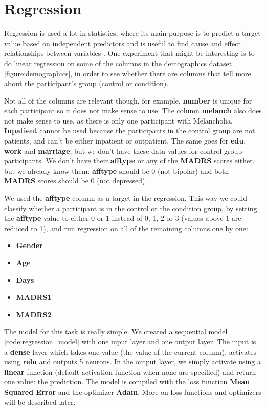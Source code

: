 
\section{Regression}

Regression is used a lot in statistics, where its main purpose is to predict a target value based on independent predictors and is useful to find cause and effect 
relationships between variables \cite{linear_regression_ml}. One experiment that might be interesting is to do linear regression on some of the columns in the demographics dataset 
\ref{figure:demographics}, in order to see whether there are columns that tell more about the participant's group (control or condition).  

Not all of the columns are relevant though, for example, \textbf{number} is unique for each participant so it does not make sense to use. 
The column \textbf{melanch} also does not make sense to use, as there is only one participant with Melancholia. 
\textbf{Inpatient} cannot be used because the participants in the control group are not patients, and can't be either inpatient or outpatient. 
The same goes for \textbf{edu}, \textbf{work} and \textbf{marriage}, but we don't have these data values for control group participants. 
We don't have their \textbf{afftype} or any of the \textbf{MADRS} scores either, but we already know them: \textbf{afftype} should be 0 (not bipolar) 
and both \textbf{MADRS} scores should be 0 (not depressed). 

We used the \textbf{afftype} column as a target in the regression. This way we could classify whether a participant is in the control or the condition group, 
by setting the \textbf{afftype} value to either 0 or 1 instead of 0, 1, 2 or 3 (values above 1 are reduced to 1), and run regression on all of the remaining 
columns one by one:

\begin{itemize}
      \item \textbf{Gender}
      \item \textbf{Age}
      \item \textbf{Days}
      \item \textbf{MADRS1}
      \item \textbf{MADRS2}
\end{itemize}



The model for this task is really simple. We created a sequential model \ref{code:regression_model} with one input layer and one output layer. 
The input is a \textbf{dense} layer which takes one value (the value of the current column), activates using \textbf{relu} and outputs 5 neurons. 
In the output layer, we simply activate using a \textbf{linear} function (default activation function when none are specified) and return one value: the prediction. 
The model is compiled with the loss function \textbf{Mean Squared Error} and the optimizer \textbf{Adam}. More on loss functions and optimizers will be described later. 

